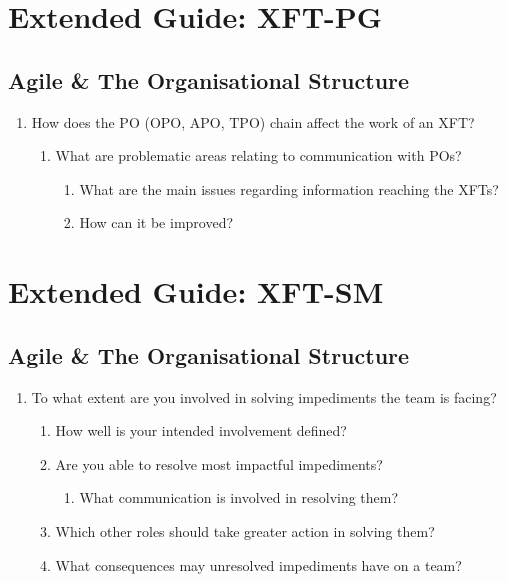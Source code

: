\section*{Extended Guide: XFT-PG}

\subsection*{Agile \& The Organisational Structure}

\begin{enumerate}
   \item How does the PO (OPO, APO, TPO) chain affect the work of an XFT?
    
       \begin{enumerate}
            \item What are problematic areas relating to communication with POs?
          
             \begin{enumerate}
                \item What are the main issues regarding information reaching the XFTs?
                \item How can it be improved?
              \end{enumerate}
        \end{enumerate}
\end{enumerate}

\section*{Extended Guide: XFT-SM}

\subsection*{Agile \& The Organisational Structure}

\begin{enumerate}
   \item To what extent are you involved in solving impediments the team is facing?
    
       \begin{enumerate}
            \item How well is your intended involvement defined?
            \item Are you able to resolve most impactful impediments?
          
             \begin{enumerate}
                  \item What communication is involved in resolving them?
               \end{enumerate}
          
          \item Which other roles should take greater action in solving them?
            \item What consequences may unresolved impediments have on a team?
        \end{enumerate}
\end{enumerate}

